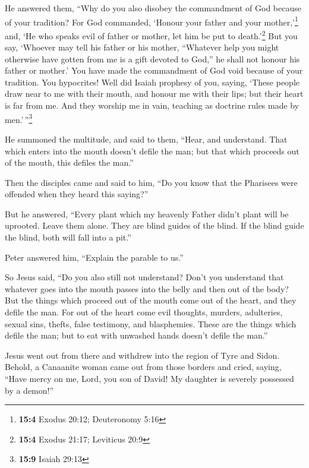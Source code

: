  He answered them, ``Why do you also disobey the
commandment of God because of your tradition?  For God
commanded, `Honour your father and your mother,'\footnote{\textbf{15:4}
  Exodus 20:12; Deuteronomy 5:16} and, `He who speaks evil of father or
mother, let him be put to death.'\footnote{\textbf{15:4} Exodus 21:17;
  Leviticus 20:9}  But you say, `Whoever may tell his
father or his mother, ``Whatever help you might otherwise have gotten
from me is a gift devoted to God,''  he shall not honour
his father or mother.' You have made the commandment of God void because
of your tradition.  You hypocrites! Well did Isaiah
prophesy of you, saying,  `These people draw near to me
with their mouth, and honour me with their lips; but their heart is far
from me.  And they worship me in vain, teaching as
doctrine rules made by men.'\,''\footnote{\textbf{15:9} Isaiah 29:13}

 He summoned the multitude, and said to them, ``Hear, and
understand.  That which enters into the mouth doesn't
defile the man; but that which proceeds out of the mouth, this defiles
the man.''

 Then the disciples came and said to him, ``Do you know
that the Pharisees were offended when they heard this saying?''

 But he answered, ``Every plant which my heavenly Father
didn't plant will be uprooted.  Leave them alone. They
are blind guides of the blind. If the blind guide the blind, both will
fall into a pit.''

 Peter answered him, ``Explain the parable to us.''

 So Jesus said, ``Do you also still not understand?
 Don't you understand that whatever goes into the mouth
passes into the belly and then out of the body?  But the
things which proceed out of the mouth come out of the heart, and they
defile the man.  For out of the heart come evil thoughts,
murders, adulteries, sexual sins, thefts, false testimony, and
blasphemies.  These are the things which defile the man;
but to eat with unwashed hands doesn't defile the man.''

 Jesus went out from there and withdrew into the region
of Tyre and Sidon.  Behold, a Canaanite woman came out
from those borders and cried, saying, ``Have mercy on me, Lord, you son
of David! My daughter is severely possessed by a demon!''

